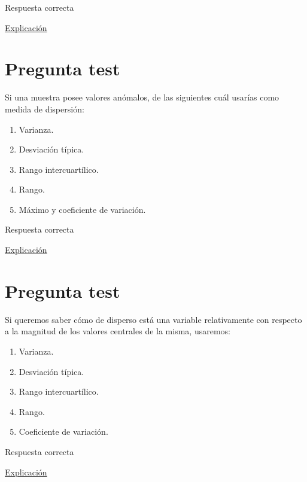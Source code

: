 \documentclass[
]{book}
\providecommand{\tightlist}{%
  \setlength{\itemsep}{0pt}\setlength{\parskip}{0pt}}
\begin{document}
Respuesta correcta

\href{https://1fjmanzano.github.io/bioestadistica/medidas-de-posicio\%CC\%81n-dispersio\%CC\%81n-y-forma.html\#medidas-de-posicio\%CC\%81n-centrales}{Explicación}

\hypertarget{pregunta-test-76}{%
\section{Pregunta test}\label{pregunta-test-76}}

Si una muestra posee valores anómalos, de las siguientes cuál usarías como medida de dispersión:

\begin{enumerate}
\def\labelenumi{\alph{enumi})}
\tightlist
\item
  Varianza.
\item
  Desviación típica.
\item
  Rango intercuartílico.
\item
  Rango.
\item
  Máximo y coeficiente de variación.
\end{enumerate}

Respuesta correcta

\href{https://1fjmanzano.github.io/bioestadistica/medidas-de-posicio\%CC\%81n-dispersio\%CC\%81n-y-forma.html\#medidas-de-dispersio\%CC\%81n}{Explicación}

\hypertarget{pregunta-test-77}{%
\section{Pregunta test}\label{pregunta-test-77}}

Si queremos saber cómo de disperso está una variable relativamente con respecto a la magnitud de los valores centrales de la misma, usaremos:

\begin{enumerate}
\def\labelenumi{\alph{enumi})}
\tightlist
\item
  Varianza.
\item
  Desviación típica.
\item
  Rango intercuartílico.
\item
  Rango.
\item
  Coeficiente de variación.
\end{enumerate}

Respuesta correcta

\href{https://en.wikipedia.org/wiki/Coefficient_of_variation}{Explicación}
\end{document}
